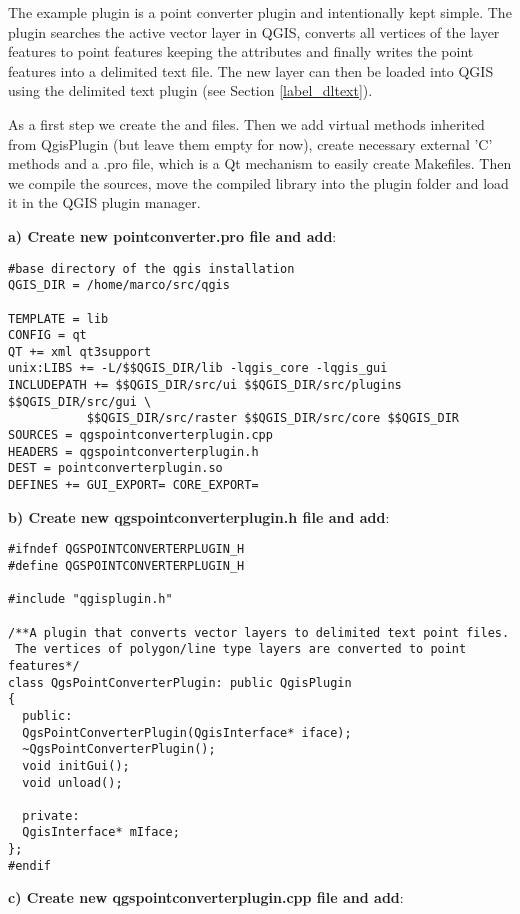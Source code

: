 The example plugin is a point converter plugin and intentionally kept simple. 
The plugin searches the active vector layer in QGIS, converts all vertices of
the layer features to point features keeping the attributes and finally
writes the point features into a delimited text file. The new layer can then
be loaded into QGIS using the delimited text plugin (see Section
\ref{label_dltext}).


As a first step we create the  and
 files. Then we add virtual methods inherited
from QgisPlugin (but leave them empty for now), create necessary external 'C'
methods and a .pro file, which is a Qt mechanism to easily create Makefiles.
Then we compile the sources, move the compiled library into the plugin folder
and load it in the QGIS plugin manager.

\textbf{a) Create new pointconverter.pro file and add}:

\begin{verbatim}
#base directory of the qgis installation
QGIS_DIR = /home/marco/src/qgis

TEMPLATE = lib
CONFIG = qt
QT += xml qt3support
unix:LIBS += -L/$$QGIS_DIR/lib -lqgis_core -lqgis_gui
INCLUDEPATH += $$QGIS_DIR/src/ui $$QGIS_DIR/src/plugins  $$QGIS_DIR/src/gui \
	       $$QGIS_DIR/src/raster $$QGIS_DIR/src/core $$QGIS_DIR 
SOURCES = qgspointconverterplugin.cpp
HEADERS = qgspointconverterplugin.h
DEST = pointconverterplugin.so
DEFINES += GUI_EXPORT= CORE_EXPORT=
\end{verbatim}

\textbf{b) Create new qgspointconverterplugin.h file and add}:

\begin{verbatim}
#ifndef QGSPOINTCONVERTERPLUGIN_H
#define QGSPOINTCONVERTERPLUGIN_H

#include "qgisplugin.h"

/**A plugin that converts vector layers to delimited text point files.
 The vertices of polygon/line type layers are converted to point features*/
class QgsPointConverterPlugin: public QgisPlugin
{
  public:
  QgsPointConverterPlugin(QgisInterface* iface);
  ~QgsPointConverterPlugin();
  void initGui();
  void unload();
  
  private:
  QgisInterface* mIface;
};
#endif
\end{verbatim}

\textbf{c) Create new qgspointconverterplugin.cpp file and add}:

